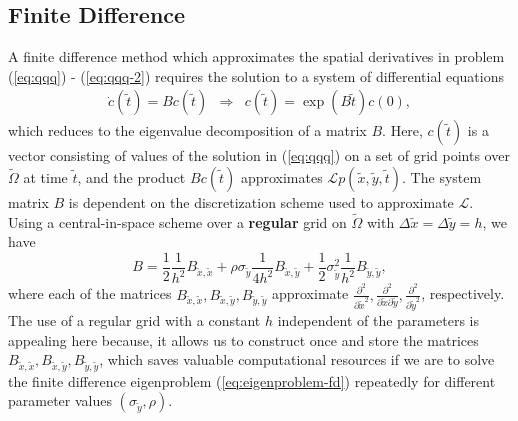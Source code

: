 \subsection{Finite Difference} \label{sec:finite-difference} A finite
difference method which approximates the spatial derivatives in
problem (\ref{eq:qqq}) - (\ref{eq:qqq-2}) requires the solution to a
system of differential equations
\begin{align}
  \dot{c}(\tilde{t})= B c(\tilde{t}) &\Rightarrow& c(\tilde{t}) = \exp\left( B\tilde{t} \right)c(0) \label{eq:eigenproblem-fd}, 
\end{align}
which reduces to the eigenvalue decomposition of a matrix $B$. Here,
$c(\tilde{t})$ is a vector consisting of values of the solution in
(\ref{eq:qqq}) on a set of grid points over $\tilde{\Omega}$ at time
$\tilde{t}$, and the product $Bc(\tilde{t})$ approximates
$\mathcal{L}p(\tilde{x},\tilde{y},\tilde{t})$. The system matrix $B$
is dependent on the discretization scheme used to approximate
$\mathcal{L}$. Using a central-in-space scheme over a \textbf{regular}
grid on $\tilde{\Omega}$ with
$\Delta \tilde{x} = \Delta \tilde{y} = h$, we have
\[ B = \frac{1}{2} \frac{1}{h^2}B_{\tilde{x},\tilde{x}} +
  \rho\sigma_{\tilde{y}} \frac{1}{4h^2}B_{\tilde{x},\tilde{y}} + \frac{1}{2}\sigma_{\tilde{y}}^2
  \frac{1}{h^2}B_{\tilde{y},\tilde{y}},
\]
where each of the matrices
$B_{\tilde{x},\tilde{x}}, B_{\tilde{x},\tilde{y}},
B_{\tilde{y},\tilde{y}}$ approximate
$\frac{\partial^2}{\partial \tilde{x}^2}, \frac{\partial^2}{\partial
  \tilde{x} \partial \tilde{y}}, \frac{\partial^2}{\partial
  \tilde{y}^2}$, respectively.
The use of a regular grid with a constant $h$ independent of the
parameters is appealing here because, it allows us to construct once
and store the matrices
$B_{\tilde{x},\tilde{x}}, B_{\tilde{x},\tilde{y}},
B_{\tilde{y},\tilde{y}}$, which saves valuable computational resources
if we are to solve the finite difference eigenproblem
(\ref{eq:eigenproblem-fd}) repeatedly for different parameter values
$(\sigma_{\tilde{y}},\rho)$.

